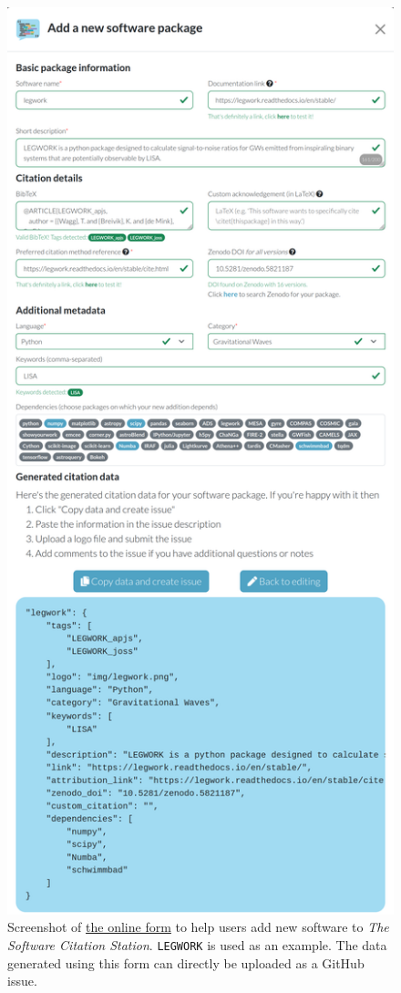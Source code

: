 \documentclass[twocolumn,linenumbers]{aastex631}
\newcommand{\site}{\textit{The Software Citation Station}\xspace}
\begin{document}
\begin{figure}
    \centering
    \includegraphics[width=\columnwidth]{figures/new-software-form.png}
    \caption{Screenshot of \href{https://www.tomwagg.com/software-citation-station/?new-software=true}{the online form} to help users add new software to \site. \texttt{LEGWORK} \citep{LEGWORK_joss,LEGWORK_apjs} is used as an example. The data generated using this form can directly be uploaded as a GitHub issue.}
    \label{fig:scs-new-software-screenshot}
\end{figure}
\end{document}
